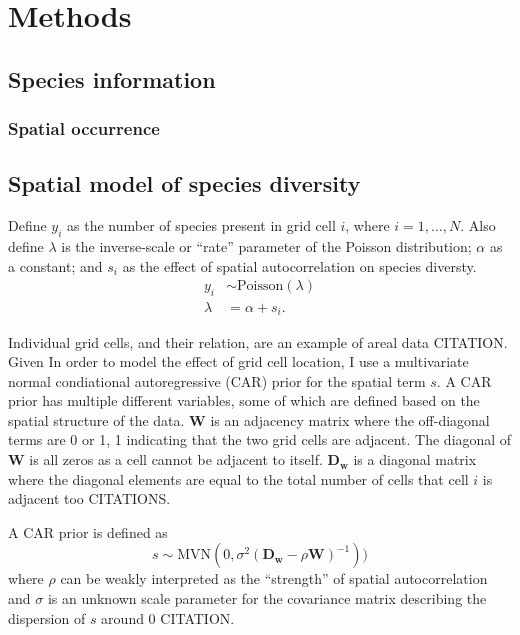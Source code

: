 \documentclass[12pt,letterpaper]{article}
\begin{document}
\section{Methods}
\subsection{Species information}

\subsubsection{Spatial occurrence}

\subsection{Spatial model of species diversity}

Define \(y_{i}\) as the number of species present in grid cell \(i\), where \(i = 1, \dots, N\). Also define \(\lambda\) is the inverse-scale or ``rate'' parameter of the Poisson distribution; \(\alpha\) as a constant; and \(s_{i}\) as the effect of spatial autocorrelation on species diversty.
\begin{equation}
  \begin{aligned}
    y_{i} &\sim \mathrm{Poisson}(\lambda) \\
    \lambda &= \alpha + s_{i}.
  \end{aligned}
  \label{eq:model}
\end{equation}

Individual grid cells, and their relation, are an example of areal data CITATION. Given In order to model the effect of grid cell location, I use a multivariate normal condiational autoregressive (CAR) prior for the spatial term \(s\). A CAR prior has multiple different variables, some of which are defined based on the spatial structure of the data. \(\mathbf{W}\) is an adjacency matrix where the off-diagonal terms are 0 or 1, 1 indicating that the two grid cells are adjacent. The diagonal of \(\mathbf{W}\) is all zeros as a cell cannot be adjacent to itself. \(\mathbf{D_{w}}\) is a diagonal matrix where the diagonal elements are equal to the total number of cells that cell \(i\) is adjacent too CITATIONS.

A CAR prior is defined as
\begin{equation}
  s \sim \mathrm{MVN}(0, \sigma^{2} (\mathbf{D_{w}} - \rho \mathbf{W})^{-1}))
  \label{eq:car}
\end{equation}
where \(\rho\) can be weakly interpreted as the ``strength'' of spatial autocorrelation and \(\sigma\) is an unknown scale parameter for the covariance matrix describing the dispersion of \(s\) around 0 CITATION.
\end{document}
